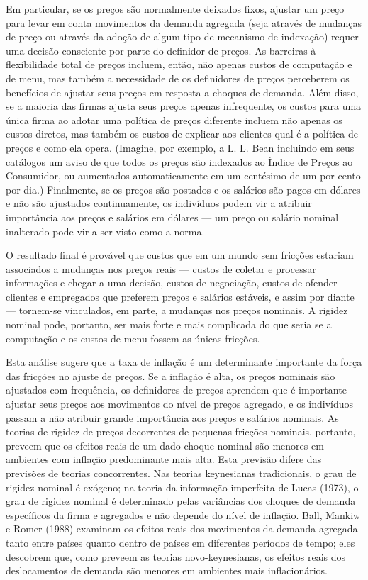 \documentclass[12pt]{article}
\begin{document}
{Em particular, se os preços são normalmente deixados fixos, ajustar um preço para levar em conta movimentos da demanda agregada (seja através de mudanças de preço ou através da adoção de algum tipo de mecanismo de indexação) requer uma decisão consciente por parte do definidor de preços. As barreiras à flexibilidade total de preços incluem, então, não apenas custos de computação e de menu, mas também a necessidade de os definidores de preços perceberem os benefícios de ajustar seus preços em resposta a choques de demanda. Além disso, se a maioria das firmas ajusta seus preços apenas infrequente, os custos para uma única firma ao adotar uma política de preços diferente incluem não apenas os custos diretos, mas também os custos de explicar aos clientes qual é a política de preços e como ela opera. (Imagine, por exemplo, a L. L. Bean incluindo em seus catálogos um aviso de que todos os preços são indexados ao Índice de Preços ao Consumidor, ou aumentados automaticamente em um centésimo de um por cento por dia.) Finalmente, se os preços são postados e os salários são pagos em dólares e não são ajustados continuamente, os indivíduos podem vir a atribuir importância aos preços e salários em dólares — um preço ou salário nominal inalterado pode vir a ser visto como a norma.

O resultado final é provável que custos que em um mundo sem fricções estariam associados a mudanças nos preços reais — custos de coletar e processar informações e chegar a uma decisão, custos de negociação, custos de ofender clientes e empregados que preferem preços e salários estáveis, e assim por diante — tornem-se vinculados, em parte, a mudanças nos preços nominais. A rigidez nominal pode, portanto, ser mais forte e mais complicada do que seria se a computação e os custos de menu fossem as únicas fricções.

Esta análise sugere que a taxa de inflação é um determinante importante da força das fricções no ajuste de preços. Se a inflação é alta, os preços nominais são ajustados com frequência, os definidores de preços aprendem que é importante ajustar seus preços aos movimentos do nível de preços agregado, e os indivíduos passam a não atribuir grande importância aos preços e salários nominais. As teorias de rigidez de preços decorrentes de pequenas fricções nominais, portanto, preveem que os efeitos reais de um dado choque nominal são menores em ambientes com inflação predominante mais alta. Esta previsão difere das previsões de teorias concorrentes. Nas teorias keynesianas tradicionais, o grau de rigidez nominal é exógeno; na teoria da informação imperfeita de Lucas (1973), o grau de rigidez nominal é determinado pelas variâncias dos choques de demanda específicos da firma e agregados e não depende do nível de inflação. Ball, Mankiw e Romer (1988) examinam os efeitos reais dos movimentos da demanda agregada tanto entre países quanto dentro de países em diferentes períodos de tempo; eles descobrem que, como preveem as teorias novo-keynesianas, os efeitos reais dos deslocamentos de demanda são menores em ambientes mais inflacionários.

}
\end{document}
